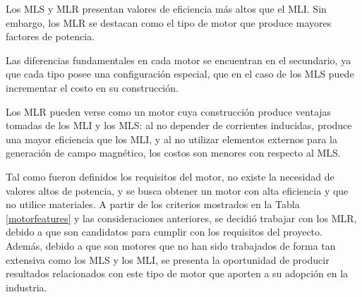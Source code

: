 Los MLS y MLR presentan valores de eficiencia más altos que el MLI. Sin embargo, los MLR se destacan como el tipo de motor que produce mayores factores de potencia.

Las diferencias fundamentales en cada motor se encuentran en el secundario, ya que cada tipo posee una configuración especial, que en el caso de los MLS puede incrementar el costo en su construcción.

Los MLR pueden verse como un motor cuya construcción produce ventajas tomadas de los MLI y los MLS: al no depender de corrientes inducidas, produce una mayor eficiencia que los MLI, y al no utilizar elementos externos para la generación de campo magnético, los costos son menores con respecto al MLS.

Tal como fueron definidos los requisitos del motor, no existe la necesidad de valores altos de potencia, y se busca obtener un motor con alta eficiencia y que no utilice materiales. A partir de los criterios mostrados en la Tabla \ref{motorfeatures} y las consideraciones anteriores, se decidió trabajar con los MLR, debido a que son candidatos para cumplir con los requisitos del proyecto. Además, debido a que son motores que no han sido trabajados de forma tan extensiva como los MLS y los MLI, se presenta la oportunidad de producir resultados relacionados con este tipo de motor que aporten a su adopción en la industria.


